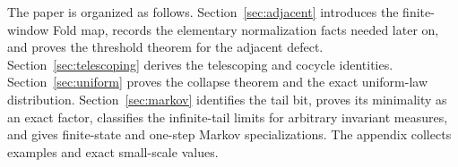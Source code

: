The paper is organized as follows.  Section~\ref{sec:adjacent} introduces the
finite-window Fold map, records the elementary normalization facts needed later
on, and proves the threshold theorem for the adjacent defect.
Section~\ref{sec:telescoping} derives the telescoping and cocycle identities.
Section~\ref{sec:uniform} proves the collapse theorem and the exact uniform-law
distribution.  Section~\ref{sec:markov} identifies the tail bit, proves its
minimality as an exact factor, classifies the infinite-tail limits for
arbitrary invariant measures, and gives finite-state and one-step Markov
specializations.  The appendix collects examples and exact small-scale values.
